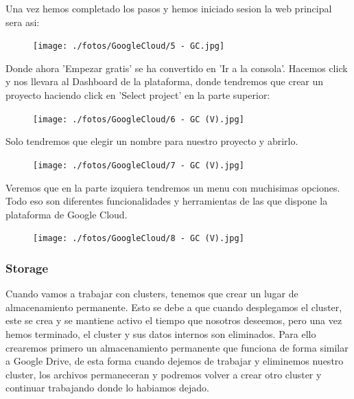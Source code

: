 \documentclass[a4paper,10pt]{article}
\begin{document}
Una vez hemos completado los pasos y hemos iniciado sesion la web principal sera asi:

\begin{figure}[H]
\begin{center}
\texttt{[image: ./fotos/GoogleCloud/5 - GC.jpg]}
\end{center}
\end{figure}

Donde ahora 'Empezar gratis' se ha convertido en 'Ir a la consola'. Hacemos click y nos llevara al Dashboard de la plataforma, donde tendremos que crear un proyecto haciendo click en 'Select project' en la parte superior:

\begin{figure}[H]
\begin{center}
\texttt{[image: ./fotos/GoogleCloud/6 - GC (V).jpg]}
\end{center}
\end{figure}

Solo tendremos que elegir un nombre para nuestro proyecto y abrirlo.

\begin{figure}[H]
\begin{center}
\texttt{[image: ./fotos/GoogleCloud/7 - GC (V).jpg]}
\end{center}
\end{figure}

Veremos que en la parte izquiera tendremos un menu con muchisimas opciones. Todo eso son diferentes funcionalidades y herramientas de las que dispone la plataforma de Google Cloud. 

\begin{figure}[H]
\begin{center}
\texttt{[image: ./fotos/GoogleCloud/8 - GC (V).jpg]}
\end{center}
\end{figure}

\subsubsection{Storage}

Cuando vamos a trabajar con clusters, tenemos que crear un lugar de almacenamiento permanente. Esto se debe a que cuando desplegamos el cluster, este se crea y se mantiene activo el tiempo que nosotros deseemos, pero una vez hemos terminado, el cluster y sus datos internos son eliminados. Para ello crearemos primero un almacenamiento permanente que funciona de forma similar a Google Drive, de esta forma cuando dejemos de trabajar y eliminemos nuestro cluster, los archivos permaneceran y podremos volver a crear otro cluster y continuar trabajando donde lo habiamos dejado.
\end{document}
